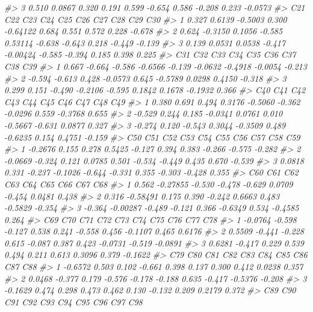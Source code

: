 \documentclass[]{book}
\newenvironment{Shaded}{\begin{snugshade}}{\end{snugshade}}
\newcommand{\CommentTok}[1]{\textcolor[rgb]{0.56,0.35,0.01}{\textit{#1}}}
\begin{document}
\begin{Shaded}
\begin{Highlighting}[]
{{{{{\CommentTok{#> 3  0.510  0.0867  0.320 0.191  0.599 -0.654  0.586 -0.208 0.233 -0.0573}
\CommentTok{#>     C21     C22     C23    C24      C25    C26    C27   C28    C29    C30}
\CommentTok{#> 1 0.327  0.6139 -0.5003  0.300 -0.64122  0.684  0.551 0.572  0.228 -0.678}
\CommentTok{#> 2 0.624 -0.3150  0.1056 -0.585  0.53114 -0.638 -0.643 0.218 -0.449 -0.139}
\CommentTok{#> 3 0.139  0.0531  0.0538 -0.417 -0.00424 -0.585 -0.394 0.185  0.398  0.225}
\CommentTok{#>      C31    C32    C33     C34    C35     C36     C37     C38    C39}
\CommentTok{#> 1  0.667 -0.664 -0.586 -0.6566 -0.139 -0.0632 -0.4918 -0.0054 -0.213}
\CommentTok{#> 2 -0.594 -0.613  0.428 -0.0573  0.645 -0.5789  0.0298  0.4150 -0.318}
\CommentTok{#> 3  0.299  0.151 -0.490 -0.2106 -0.595  0.1842  0.1678 -0.1932  0.366}
\CommentTok{#>      C40   C41    C42     C43     C44    C45     C46    C47     C48    C49}
\CommentTok{#> 1  0.380 0.691  0.494  0.3176 -0.5060 -0.362 -0.0296  0.559 -0.3768  0.655}
\CommentTok{#> 2 -0.529 0.244  0.185 -0.0341  0.0761  0.010 -0.5667 -0.631  0.0877  0.327}
\CommentTok{#> 3 -0.274 0.120 -0.543  0.3044 -0.3509  0.489 -0.6235  0.154  0.4751 -0.159}
\CommentTok{#>       C50    C51    C52     C53    C54    C55    C56    C57    C58    C59}
\CommentTok{#> 1 -0.2676  0.155  0.278  0.5425 -0.127  0.394  0.383 -0.266 -0.575 -0.282}
\CommentTok{#> 2 -0.0669 -0.324  0.121  0.0785  0.501 -0.534 -0.449  0.435  0.670 -0.539}
\CommentTok{#> 3  0.0818  0.331 -0.237 -0.1026 -0.644 -0.331  0.355 -0.303 -0.428  0.355}
\CommentTok{#>      C60      C61    C62    C63    C64     C65    C66     C67    C68}
\CommentTok{#> 1  0.562 -0.27855 -0.530 -0.478 -0.629  0.0709 -0.454  0.0481  0.438}
\CommentTok{#> 2  0.316 -0.58491  0.175  0.390 -0.242  0.6663  0.483 -0.5829 -0.354}
\CommentTok{#> 3 -0.364 -0.00287 -0.489 -0.121  0.366 -0.6349  0.534 -0.4585  0.264}
\CommentTok{#>       C69    C70    C71   C72    C73    C74   C75     C76    C77     C78}
\CommentTok{#> 1 -0.0764 -0.598 -0.127 0.538  0.241 -0.558 0.456 -0.1107  0.465  0.6176}
\CommentTok{#> 2  0.5509 -0.441 -0.228 0.615 -0.087  0.387 0.423 -0.0731 -0.519 -0.0891}
\CommentTok{#> 3  0.6281 -0.417  0.229 0.539  0.494  0.211 0.613  0.3096  0.379 -0.1622}
\CommentTok{#>       C79    C80   C81    C82    C83    C84    C85    C86     C87    C88}
\CommentTok{#> 1 -0.6572  0.503 0.102 -0.661  0.398  0.137  0.300  0.412  0.0238  0.357}
\CommentTok{#> 2  0.0468 -0.377 0.179 -0.576 -0.178 -0.188  0.635 -0.417 -0.5376 -0.208}
\CommentTok{#> 3 -0.1629  0.474 0.298  0.473  0.462  0.130 -0.132  0.209  0.2179  0.372}
\CommentTok{#>      C89    C90     C91    C92     C93    C94    C95    C96    C97    C98}
}}}}}
\end{Highlighting}
\end{Shaded}
\end{document}
